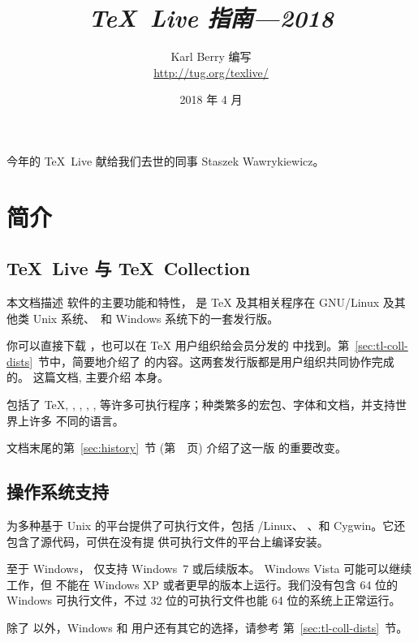 \documentclass{article}
\title{%
  {\huge \textit{\TeX\ Live 指南---2018}}%
}
\author{Karl Berry 编写 \\[3mm]
        \url{http://tug.org/texlive/}
       }
\date{2018 年 4 月}
\begin{document}
\maketitle

\begin{center}
今年的 \TeX\ Live 献给我们去世的同事 Staszek Wawrykiewicz。
\end{center}

\begin{multicols}{2}
\tableofcontents
\end{multicols}

\section{简介}
\label{sec:intro}

\subsection{\protect\TeX\protect\ Live 与 \protect\TeX\protect\ Collection}

本文档描述 \TL{} 软件的主要功能和特性，\TL{} 是 \TeX{} 及其相关程序在
GNU/Linux 及其他类 Unix 系统、\MacOSX\ 和 Windows
系统下的一套发行版。

你可以直接下载 \TL{}，也可以在 \TeX{} 用户组织给会员分发的 \TK{}
\DVD 中找到。第~\ref{sec:tl-coll-dists}~节中，简要地介绍了
\DVD 的内容。这两套发行版都是用户组织共同协作完成的。
这篇文档, 主要介绍 \TL{} 本身。

\TL{} 包括了 \TeX{}, \LaTeXe{}, \ConTeXt, \MF, \MP, \BibTeX{}
等许多可执行程序；种类繁多的宏包、字体和文档，并支持世界上许多
不同的语言。

文档末尾的第~\ref{sec:history}~节 (第~\pageref{sec:history}~页)
介绍了这一版 \TL{} 的重要改变。

\subsection{操作系统支持}
\label{sec:os-support}

\TL{} 为多种基于 Unix 的平台提供了可执行文件，包括 \GNU/Linux、
\MacOSX{}、和 Cygwin。它还包含了源代码，可供在没有提
供可执行文件的平台上编译安装。

至于 Windows，\TL{} 仅支持 Windows~7 或后续版本。
Windows Vista 可能可以继续工作，但 \TL{} 不能在 Windows XP
或者更早的版本上运行。我们没有包含 64 位的 Windows
可执行文件，不过 32 位的可执行文件也能 64 位的系统上正常运行。

除了 \TL{} 以外，Windows 和 \MacOSX 用户还有其它的选择，请参考
第~\ref{sec:tl-coll-dists}~节。
\end{document}
